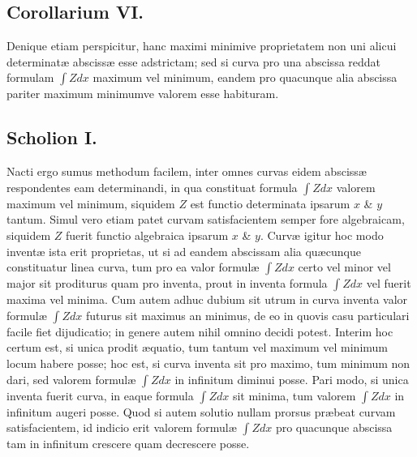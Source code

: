 \subsection*{Corollarium VI.}
Denique etiam perspicitur, hanc maximi minimive proprietatem non uni alicui determinatæ abscissæ esse adstrictam; sed si curva pro una abscissa reddat formulam $\int Zdx$ maximum vel minimum, eandem pro quacunque alia abscissa pariter maximum minimumve valorem esse habituram.

\subsection*{Scholion I.}
Nacti ergo sumus methodum facilem, inter omnes curvas eidem abscissæ respondentes eam determinandi, in qua constituat formula $\int Zdx$ valorem maximum vel minimum, siquidem $Z$ est functio determinata ipsarum $x$ \& $y$ tantum. Simul vero etiam patet curvam satisfacientem semper fore algebraicam, siquidem $Z$ fuerit functio algebraica ipsarum $x$ \& $y$. Curvæ igitur hoc modo inventæ ista erit proprietas, ut si ad eandem abscissam alia quæcunque constituatur linea curva, tum pro ea valor formulæ $\int Zdx$ certo vel minor vel major sit proditurus quam pro inventa, prout in inventa formula $\int Zdx$ vel fuerit maxima vel minima. Cum autem adhuc dubium sit utrum in curva inventa valor formulæ $\int Zdx$ futurus sit maximus an minimus, de eo in quovis casu particulari facile fiet dijudicatio; in genere autem nihil omnino decidi potest. Interim hoc certum est, si unica prodit æquatio, tum tantum vel maximum vel minimum locum habere posse; hoc est, si curva inventa sit pro maximo, tum minimum non dari, sed valorem formulæ $\int Zdx$ in infinitum diminui posse. Pari modo, si unica inventa fuerit curva, in eaque formula $\int Zdx$ sit minima, tum valorem $\int Zdx$ in infinitum augeri posse. Quod si autem solutio nullam prorsus præbeat curvam satisfacientem, id indicio erit valorem formulæ $\int Zdx$ pro quacunque abscissa tam in infinitum crescere quam decrescere posse.

